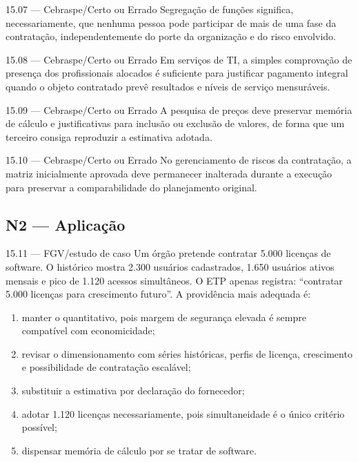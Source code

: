 \begin{questao}{ 15.07 — Cebraspe/Certo ou Errado}
Segregação de funções significa, necessariamente, que nenhuma pessoa pode participar de mais de uma fase da contratação, independentemente do porte da organização e do risco envolvido.
\end{questao}

\begin{questao}{ 15.08 — Cebraspe/Certo ou Errado}
Em serviços de TI, a simples comprovação de presença dos profissionais alocados é suficiente para justificar pagamento integral quando o objeto contratado prevê resultados e níveis de serviço mensuráveis.
\end{questao}

\begin{questao}{ 15.09 — Cebraspe/Certo ou Errado}
A pesquisa de preços deve preservar memória de cálculo e justificativas para inclusão ou exclusão de valores, de forma que um terceiro consiga reproduzir a estimativa adotada.
\end{questao}

\begin{questao}{ 15.10 — Cebraspe/Certo ou Errado}
No gerenciamento de riscos da contratação, a matriz inicialmente aprovada deve permanecer inalterada durante a execução para preservar a comparabilidade do planejamento original.
\end{questao}

\subsection*{N2 — Aplicação}

\begin{questao}{ 15.11 — FGV/estudo de caso}
Um órgão pretende contratar 5.000 licenças de software. O histórico mostra 2.300 usuários cadastrados, 1.650 usuários ativos mensais e pico de 1.120 acessos simultâneos. O ETP apenas registra: ``contratar 5.000 licenças para crescimento futuro''. A providência mais adequada é:
\begin{enumerate}[label=\Alph*)]
\item manter o quantitativo, pois margem de segurança elevada é sempre compatível com economicidade;
\item revisar o dimensionamento com séries históricas, perfis de licença, crescimento e possibilidade de contratação escalável;
\item substituir a estimativa por declaração do fornecedor;
\item adotar 1.120 licenças necessariamente, pois simultaneidade é o único critério possível;
\item dispensar memória de cálculo por se tratar de software.
\end{enumerate}
\end{questao}

